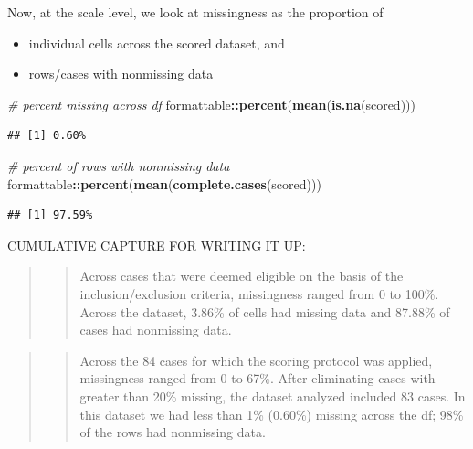 \documentclass[
  11pt,
]{book}
\newenvironment{Shaded}{\begin{snugshade}}{\end{snugshade}}
\newcommand{\CommentTok}[1]{\textcolor[rgb]{0.37,0.37,0.37}{\textit{#1}}}
\newcommand{\FunctionTok}[1]{\textcolor[rgb]{0.27,0.27,0.27}{\textbf{#1}}}
\newcommand{\NormalTok}[1]{#1}
\newcommand{\SpecialCharTok}[1]{\textcolor[rgb]{0.43,0.43,0.43}{\textbf{#1}}}
\providecommand{\tightlist}{%
  \setlength{\itemsep}{0pt}\setlength{\parskip}{0pt}}
\begin{document}
Now, at the scale level, we look at missingness as the proportion of

\begin{itemize}
\tightlist
\item
  individual cells across the scored dataset, and
\item
  rows/cases with nonmissing data
\end{itemize}

\begin{Shaded}
\begin{Highlighting}[]
\CommentTok{\# percent missing across df}
\NormalTok{formattable}\SpecialCharTok{::}\FunctionTok{percent}\NormalTok{(}\FunctionTok{mean}\NormalTok{(}\FunctionTok{is.na}\NormalTok{(scored)))}
\end{Highlighting}
\end{Shaded}

\begin{verbatim}
## [1] 0.60%
\end{verbatim}

\begin{Shaded}
\begin{Highlighting}[]
\CommentTok{\# percent of rows with nonmissing data}
\NormalTok{formattable}\SpecialCharTok{::}\FunctionTok{percent}\NormalTok{(}\FunctionTok{mean}\NormalTok{(}\FunctionTok{complete.cases}\NormalTok{(scored)))}
\end{Highlighting}
\end{Shaded}

\begin{verbatim}
## [1] 97.59%
\end{verbatim}

CUMULATIVE CAPTURE FOR WRITING IT UP:

\begin{quote}
\begin{quote}
Across cases that were deemed eligible on the basis of the inclusion/exclusion criteria, missingness ranged from 0 to 100\%. Across the dataset, 3.86\% of cells had missing data and 87.88\% of cases had nonmissing data.
\end{quote}
\end{quote}

\begin{quote}
\begin{quote}
Across the 84 cases for which the scoring protocol was applied, missingness ranged from 0 to 67\%. After eliminating cases with greater than 20\% missing, the dataset analyzed included 83 cases. In this dataset we had less than 1\% (0.60\%) missing across the df; 98\% of the rows had nonmissing data.
\end{quote}
\end{quote}
\end{document}
